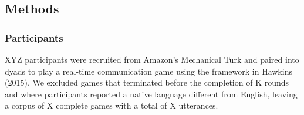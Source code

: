 \documentclass[manuscript]{stjour}
\begin{document}
\subsection{Methods}\label{methods}

\subsubsection{Participants}\label{participants}

XYZ participants were recruited from Amazon's Mechanical Turk and paired
into dyads to play a real-time communication game using the framework in
Hawkins (2015). We excluded games that terminated before the completion
of K rounds and where participants reported a native language different
from English, leaving a corpus of X complete games with a total of
X utterances.
\end{document}
